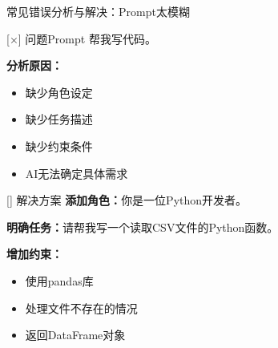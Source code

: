 \begin{frame}{常见错误分析与解决：Prompt太模糊}
	\begin{alertblock}{[×] 问题Prompt}
		帮我写代码。
	\end{alertblock}

	\vspace{0.3cm}

	\textbf{分析原因：}
	\begin{itemize}
		\item 缺少角色设定
		\item 缺少任务描述
		\item 缺少约束条件
		\item AI无法确定具体需求
	\end{itemize}

	\vspace{0.3cm}

	\begin{exampleblock}{[\checkmark] 解决方案}
		\textbf{添加角色：}你是一位Python开发者。

		\vspace{0.2cm}

		\textbf{明确任务：}请帮我写一个读取CSV文件的Python函数。

		\vspace{0.2cm}

		\textbf{增加约束：}
		\begin{itemize}
			\item 使用pandas库
			\item 处理文件不存在的情况
			\item 返回DataFrame对象
		\end{itemize}
	\end{exampleblock}
\end{frame}

